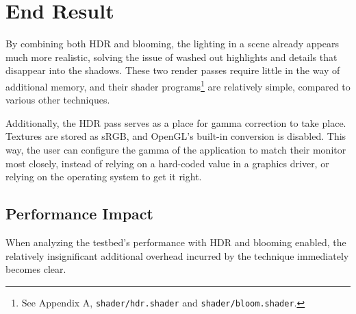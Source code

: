 \documentclass[11pt, oneside]{report}
\begin{document}
\section{End Result}
By combining both \gls{HDR} and blooming, the lighting in a scene already appears much more realistic, solving the issue of washed out highlights and details that disappear into the shadows. These two render passes require little in the way of additional memory, and their \gls{shader} programs\footnote{See Appendix A, \texttt{shader/hdr.shader} and \texttt{shader/bloom.shader}.} are relatively simple, compared to various other techniques. 

Additionally, the \gls{HDR} pass serves as a place for gamma correction to take place. Textures are stored as sRGB, and \gls{OpenGL}'s built-in conversion is disabled. This way, the user can configure the gamma of the application to match their monitor most closely, instead of relying on a hard-coded value in a graphics driver, or relying on the operating system to get it right.

\subsection{Performance Impact}
When analyzing the testbed's performance with \gls{HDR} and blooming enabled, the relatively insignificant additional overhead incurred by the technique immediately becomes clear.
\end{document}
